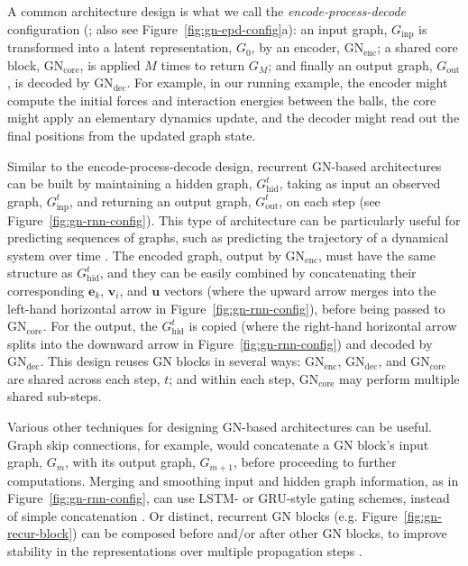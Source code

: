 A common architecture design is what we call the \emph{encode-process-decode} configuration (\cite{hamrick2018relational}; also see Figure~\ref{fig:gn-epd-config}a): an input graph, $G_{\textrm{inp}}$ is transformed into a latent representation, $G_0$, by an encoder, $\text{GN}_{\textrm{enc}}$; a shared core block, $\text{GN}_{\textrm{core}}$, is applied $M$ times to return $G_M$; and finally an output graph, $G_{\textrm{out}}$, is decoded by $\text{GN}_{\textrm{dec}}$.
For example, in our running example, the encoder might compute the initial forces and interaction energies between the balls, the core might apply an elementary dynamics update, and the decoder might read out the final positions from the updated graph state.

Similar to the encode-process-decode design, recurrent GN-based architectures can be built by maintaining a hidden graph, $G^t_{\textrm{hid}}$, taking as input an observed graph, $G^t_{\textrm{inp}}$, and returning an output graph, $G^t_{\textrm{out}}$, on each step (see Figure~\ref{fig:gn-rnn-config}).
This type of architecture can be particularly useful for predicting sequences of graphs, such as predicting the trajectory of a dynamical system over time \citep[e.g.][]{sanchez2018graph}.
The encoded graph, output by $\text{GN}_{\textrm{enc}}$, must have the same structure as $G^t_{\textrm{hid}}$, and they can be easily combined by concatenating their corresponding $\mathbf{e}_k$, $\mathbf{v}_i$, and $\mathbf{u}$ vectors (where the upward arrow merges into the left-hand horizontal arrow in Figure~\ref{fig:gn-rnn-config}), before being passed to $\textrm{GN}_{\textrm{core}}$. 
For the output, the $G^t_{\textrm{hid}}$ is copied (where the right-hand horizontal arrow splits into the downward arrow in Figure~\ref{fig:gn-rnn-config}) and decoded by $\textrm{GN}_{\textrm{dec}}$.
This design reuses GN blocks in several ways: $\textrm{GN}_{\textrm{enc}}$, $\textrm{GN}_{\textrm{dec}}$, and  $\textrm{GN}_{\textrm{core}}$ are shared across each step, $t$; and within each step, $\textrm{GN}_{\textrm{core}}$ may perform multiple shared sub-steps.

Various other techniques for designing GN-based architectures can be useful. Graph skip connections, for example, would concatenate a GN block's input graph, $G_m$, with its output graph, $G_{m+1}$, before proceeding to further computations. Merging and smoothing input and hidden graph information, as in Figure~\ref{fig:gn-rnn-config}, can use LSTM- or GRU-style gating schemes, instead of simple concatenation \citep{li2015gated}. Or distinct, recurrent GN blocks (e.g. Figure~\ref{fig:gn-recur-block}) can be composed before and/or after other GN blocks, to improve stability in the representations over multiple propagation steps \citep{sanchez2018graph}.

